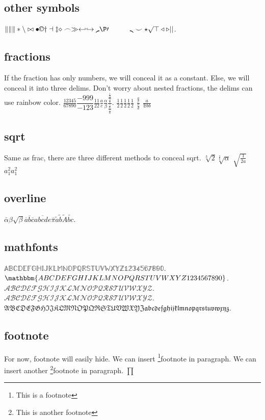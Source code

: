\documentclass{ctexbook}
\begin{document}
\subsection{other symbols}
\(\| \lVert \rVert \ast \backslash \bowtie \bullet \copyright \dagger \dashv \ddagger \diamond \frown \gg \hookleftarrow \hookrightarrow \lmoustache \P \prime \quad \qquad \rmoustache \smile \star \surd \top \triangleleft \triangleright \lvert \rvert \).

\subsection{fractions}
If the fraction has only numbers, we will conceal it as a constant.
Else, we will conceal it into three delims. Don't worry about nested fractions, the delims can use rainbow color.
\(\frac{12345}{67890} \dfrac{-999}{-123} \tfrac{11}{22} \frac{a}{c} \frac{\alpha}{\beta} \frac{\frac{\frac{1}{2}}{\frac{3}{4}}}{\frac{\frac{5}{6}}{\frac{7}{8}}}\).
\(\frac {1}2 \frac {1} 2 \frac 1 2 \frac 12 \frac12\)
\( \frac{\frac{a}{c}}{\frac{c}{d}}\)
\(\frac{a}{\mathbb{B}bb}\)
\subsection{sqrt}
Same as frac, there are three different methods to conceal sqrt.
\(\sqrt[3]{2} \sqrt[\frac{a}{b}]{\alpha}\)
\(\sqrt{\frac{1}{2a}}\)
\(a_{1}^{2} a^2_1\)
\subsection{overline}
\(\bar{ \alpha } \beta \sqrt{\beta} \overline{a} \overline{b} \overline{c} \overline{abcde}  \overline{\pi} \tilde{a} \tilde{b} \tilde{A} \tilde{bc} \).
\subsection{mathfonts}
\(\mathbb{ABCDEFGHIJKLMNOPQRSTUVWXYZ1234567890} \).
\(\mathbbm{ABCDEFGHIJKLMNOPQRSTUVWXYZ1234567890} \).
\(\mathcal{ABCDEFGHIJKLMNOPQRSTUVWXYZ}\).
\(\mathscr{ABCDEFGHIJKLMNOPQRSTUVWXYZ}\).
\(\mathfrak{ABCDEFGHIJKLMNOPQRSTUVWXYZabcdefghijklmnopqrstuvwxyz}\).

\subsection{footnote}
For now, footnote will easily hide.
We can insert \footnote{This is a footnote}{footnote} in paragraph.
We can insert another \footnote{This is another footnote}{footnote} in paragraph.
\(\prod\)
\end{document}
